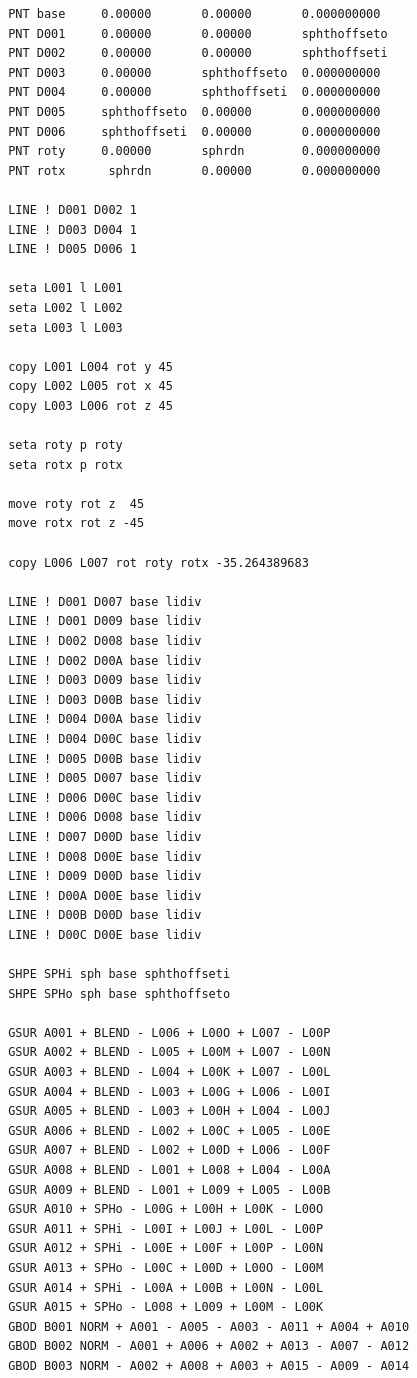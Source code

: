 \documentclass{article}
\begin{document}
\begin{appendix}
\begin{verbatim}
 PNT base     0.00000       0.00000       0.000000000
 PNT D001     0.00000       0.00000       sphthoffseto
 PNT D002     0.00000       0.00000       sphthoffseti
 PNT D003     0.00000       sphthoffseto  0.000000000
 PNT D004     0.00000       sphthoffseti  0.000000000
 PNT D005     sphthoffseto  0.00000       0.000000000
 PNT D006     sphthoffseti  0.00000       0.000000000
 PNT roty     0.00000       sphrdn        0.000000000
 PNT rotx      sphrdn       0.00000       0.000000000

 LINE ! D001 D002 1
 LINE ! D003 D004 1
 LINE ! D005 D006 1

 seta L001 l L001
 seta L002 l L002
 seta L003 l L003

 copy L001 L004 rot y 45
 copy L002 L005 rot x 45
 copy L003 L006 rot z 45

 seta roty p roty
 seta rotx p rotx

 move roty rot z  45
 move rotx rot z -45

 copy L006 L007 rot roty rotx -35.264389683

 LINE ! D001 D007 base lidiv
 LINE ! D001 D009 base lidiv
 LINE ! D002 D008 base lidiv
 LINE ! D002 D00A base lidiv
 LINE ! D003 D009 base lidiv
 LINE ! D003 D00B base lidiv
 LINE ! D004 D00A base lidiv
 LINE ! D004 D00C base lidiv
 LINE ! D005 D00B base lidiv
 LINE ! D005 D007 base lidiv
 LINE ! D006 D00C base lidiv
 LINE ! D006 D008 base lidiv
 LINE ! D007 D00D base lidiv
 LINE ! D008 D00E base lidiv
 LINE ! D009 D00D base lidiv
 LINE ! D00A D00E base lidiv
 LINE ! D00B D00D base lidiv
 LINE ! D00C D00E base lidiv

 SHPE SPHi sph base sphthoffseti
 SHPE SPHo sph base sphthoffseto

 GSUR A001 + BLEND - L006 + L00O + L007 - L00P
 GSUR A002 + BLEND - L005 + L00M + L007 - L00N 
 GSUR A003 + BLEND - L004 + L00K + L007 - L00L  
 GSUR A004 + BLEND - L003 + L00G + L006 - L00I 
 GSUR A005 + BLEND - L003 + L00H + L004 - L00J 
 GSUR A006 + BLEND - L002 + L00C + L005 - L00E 
 GSUR A007 + BLEND - L002 + L00D + L006 - L00F
 GSUR A008 + BLEND - L001 + L008 + L004 - L00A 
 GSUR A009 + BLEND - L001 + L009 + L005 - L00B  
 GSUR A010 + SPHo - L00G + L00H + L00K - L00O 
 GSUR A011 + SPHi - L00I + L00J + L00L - L00P
 GSUR A012 + SPHi - L00E + L00F + L00P - L00N 
 GSUR A013 + SPHo - L00C + L00D + L00O - L00M
 GSUR A014 + SPHi - L00A + L00B + L00N - L00L 
 GSUR A015 + SPHo - L008 + L009 + L00M - L00K
 GBOD B001 NORM + A001 - A005 - A003 - A011 + A004 + A010
 GBOD B002 NORM - A001 + A006 + A002 + A013 - A007 - A012 
 GBOD B003 NORM - A002 + A008 + A003 + A015 - A009 - A014


\end{verbatim}
\end{appendix}
\end{document}
